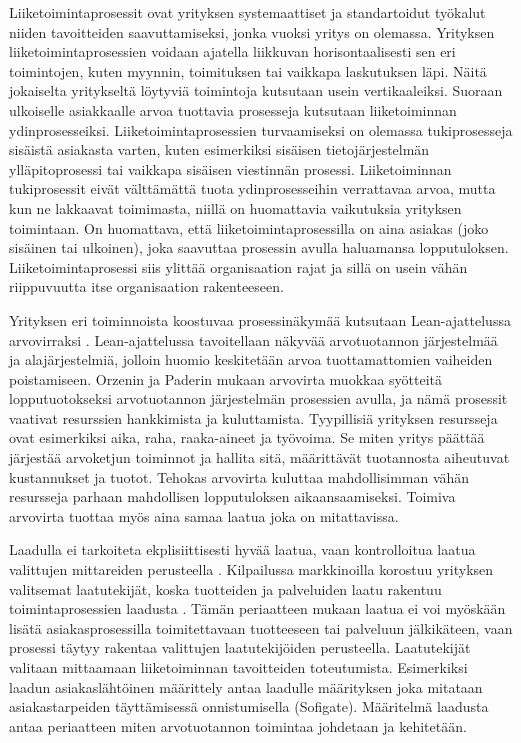 \documentclass[finnish,12pt,a4paper,pdftex]{article}
\begin{document}
Liiketoimintaprosessit ovat yrityksen systemaattiset ja standartoidut työkalut niiden tavoitteiden saavuttamiseksi, jonka vuoksi yritys on olemassa. Yrityksen liiketoimintaprosessien voidaan ajatella liikkuvan horisontaalisesti sen eri toimintojen, kuten myynnin, toimituksen tai vaikkapa laskutuksen läpi. Näitä jokaiselta yritykseltä löytyviä toimintoja kutsutaan usein vertikaaleiksi. Suoraan ulkoiselle asiakkaalle arvoa tuottavia prosesseja kutsutaan liiketoiminnan ydinprosesseiksi. Liiketoimintaprosessien turvaamiseksi on olemassa tukiprosesseja sisäistä asiakasta varten, kuten esimerkiksi sisäisen tietojärjestelmän ylläpitoprosessi tai vaikkapa sisäisen viestinnän prosessi. Liiketoiminnan tukiprosessit eivät välttämättä tuota ydinprosesseihin verrattavaa arvoa, mutta kun ne lakkaavat toimimasta, niillä on huomattavia vaikutuksia yrityksen toimintaan. On huomattava, että liiketoimintaprosessilla on aina asiakas (joko sisäinen tai ulkoinen), joka saavuttaa prosessin avulla haluamansa lopputuloksen. Liiketoimintaprosessi siis ylittää organisaation rajat ja sillä on usein vähän riippuvuutta itse organisaation rakenteeseen.

Yrityksen eri toiminnoista koostuvaa prosessinäkymää kutsutaan Lean-ajattelussa arvovirraksi \citep{leanit}. Lean-ajattelussa tavoitellaan näkyvää arvotuotannon järjestelmää ja alajärjestelmiä, jolloin huomio keskitetään arvoa tuottamattomien vaiheiden poistamiseen. Orzenin ja Paderin mukaan arvovirta muokkaa syötteitä lopputuotokseksi arvotuotannon järjestelmän prosessien avulla, ja nämä prosessit vaativat resurssien hankkimista ja kuluttamista. Tyypillisiä yrityksen resursseja ovat esimerkiksi aika, raha, raaka-aineet ja työvoima. Se miten yritys päättää järjestää arvoketjun toiminnot ja hallita sitä, määrittävät tuotannosta aiheutuvat kustannukset ja tuotot. Tehokas arvovirta kuluttaa mahdollisimman vähän resursseja parhaan mahdollisen lopputuloksen aikaansaamiseksi. Toimiva arvovirta tuottaa myös aina samaa laatua joka on mitattavissa.

Laadulla ei tarkoiteta ekplisiittisesti hyvää laatua, vaan kontrolloitua laatua valittujen mittareiden perusteella \citep{okaytannot}. Kilpailussa markkinoilla korostuu yrityksen valitsemat laatutekijät, koska tuotteiden ja palveluiden laatu rakentuu toimintaprosessien laadusta \citep{ohjelmistotuotanto, teollisuustalous}. Tämän periaatteen mukaan laatua ei voi myöskään lisätä asiakasprosessilla toimitettavaan tuotteeseen tai palveluun jälkikäteen, vaan prosessi täytyy rakentaa valittujen laatutekijöiden perusteella. Laatutekijät valitaan mittaamaan liiketoiminnan tavoitteiden toteutumista. Esimerkiksi laadun asiakaslähtöinen määrittely antaa laadulle määrityksen joka mitataan asiakastarpeiden täyttämisessä onnistumisella (Sofigate). Määritelmä laadusta antaa periaatteen miten arvotuotannon toimintaa johdetaan ja kehitetään. 
\end{document}
